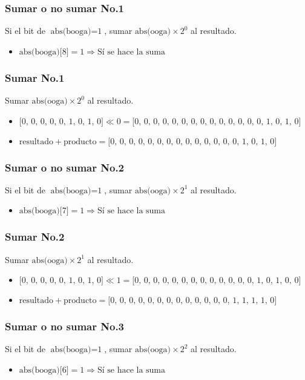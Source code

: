 \documentclass{beamer}
\begin{document}
\begin{frame}
\frametitle{Sumar o no sumar No.1}
Si el bit de $\text{abs(booga)}=\text{1}$, sumar $\text{abs(ooga)}\times\text{2}^{\text{0}}$ al resultado.
\begin{itemize}
\item $\text{abs(booga)[8]}=\text{1}\Longrightarrow\text{Sí se hace la suma}$
\end{itemize}
\end{frame}
\begin{frame}
\frametitle{Sumar No.1}
Sumar $\text{abs(ooga)}\times\text{2}^{\text{0}}$ al resultado.
\begin{itemize}
\item $\text{[0, 0, 0, 0, 0, 1, 0, 1, 0]}\ll\text{0}=\text{[0, 0, 0, 0, 0, 0, 0, 0, 0, 0, 0, 0, 0, 0, 1, 0, 1, 0]}$
\item $\text{resultado}+\text{producto}=\text{[0, 0, 0, 0, 0, 0, 0, 0, 0, 0, 0, 0, 0, 0, 1, 0, 1, 0]}$
\end{itemize}
\end{frame}
\begin{frame}
\frametitle{Sumar o no sumar No.2}
Si el bit de $\text{abs(booga)}=\text{1}$, sumar $\text{abs(ooga)}\times\text{2}^{\text{1}}$ al resultado.
\begin{itemize}
\item $\text{abs(booga)[7]}=\text{1}\Longrightarrow\text{Sí se hace la suma}$
\end{itemize}
\end{frame}
\begin{frame}
\frametitle{Sumar No.2}
Sumar $\text{abs(ooga)}\times\text{2}^{\text{1}}$ al resultado.
\begin{itemize}
\item $\text{[0, 0, 0, 0, 0, 1, 0, 1, 0]}\ll\text{1}=\text{[0, 0, 0, 0, 0, 0, 0, 0, 0, 0, 0, 0, 0, 1, 0, 1, 0, 0]}$
\item $\text{resultado}+\text{producto}=\text{[0, 0, 0, 0, 0, 0, 0, 0, 0, 0, 0, 0, 0, 1, 1, 1, 1, 0]}$
\end{itemize}
\end{frame}
\begin{frame}
\frametitle{Sumar o no sumar No.3}
Si el bit de $\text{abs(booga)}=\text{1}$, sumar $\text{abs(ooga)}\times\text{2}^{\text{2}}$ al resultado.
\begin{itemize}
\item $\text{abs(booga)[6]}=\text{1}\Longrightarrow\text{Sí se hace la suma}$
\end{itemize}
\end{frame}
\end{document}
